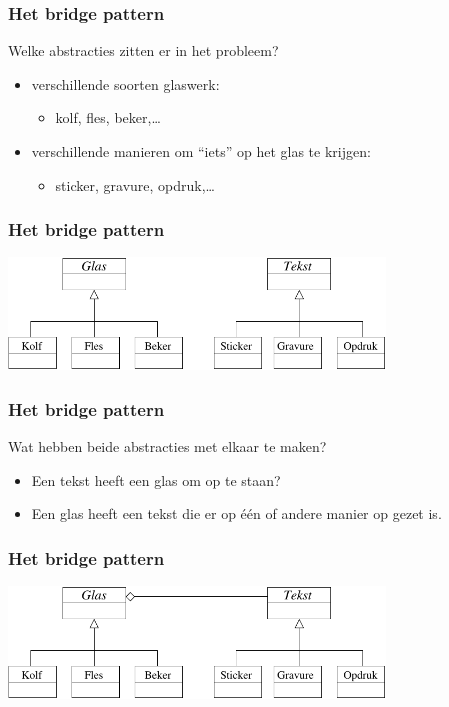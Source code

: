 \documentclass{beamer}
\begin{document}
\begin{frame}
\frametitle{Het bridge pattern}
Welke abstracties zitten er in het probleem?\pause
\begin{itemize}
\item verschillende soorten glaswerk:
  \begin{itemize}
  \item kolf, fles, beker,\ldots
  \end{itemize}\pause
\item verschillende manieren om ``iets'' op het glas te krijgen:
  \begin{itemize}
  \item sticker, gravure, opdruk,\ldots
  \end{itemize}
\end{itemize}
\end{frame}

\begin{frame}
\frametitle{Het bridge pattern}
\begin{center}
\includegraphics[width=10cm]{bridge5}
\end{center}
\end{frame}

\begin{frame}
\frametitle{Het bridge pattern}
Wat hebben beide abstracties met elkaar te maken?\pause
\begin{itemize}
\item Een tekst heeft een glas om op te staan?
\item Een glas heeft een tekst die er op \'e\'en of andere manier op gezet is.
\end{itemize}
\end{frame}


\begin{frame}
\frametitle{Het bridge pattern}
\begin{center}
\includegraphics[width=10cm]{bridge6}
\end{center}
\end{frame}
\end{document}
